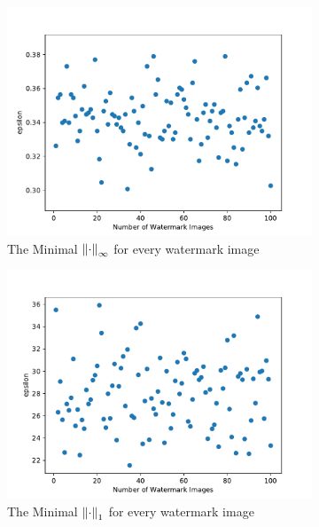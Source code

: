 \documentclass[a4paper]{llncs}
\begin{document}
\begin{figure}[h!]
  \centering
  \begin{subfigure}{0.4\linewidth}
    \includegraphics[width=\linewidth]{../data/results/problem1/mnist_w_wm.pdf}
     \caption{The Minimal $\left\lVert\cdot\right\rVert_{\infty}$ for every watermark image}
  \end{subfigure}
  \begin{subfigure}{0.4\linewidth}
    \includegraphics[width=\linewidth]{../data/results/problem2/mnist_w_wm.pdf}
    \caption{The Minimal $\left\lVert\cdot\right\rVert_1$ for every watermark image}
  \end{subfigure}
  \centering
  \begin{subfigure}{0.4\linewidth}

\end{subfigure}
\end{figure}
\end{document}
